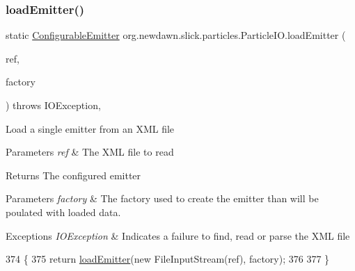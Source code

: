 \subsubsection{\texorpdfstring{load\+Emitter()}{loadEmitter()}\hspace{0.1cm}{\footnotesize\ttfamily [5/6]}}
{\footnotesize\ttfamily static \mbox{\hyperlink{classorg_1_1newdawn_1_1slick_1_1particles_1_1_configurable_emitter}{Configurable\+Emitter}} org.\+newdawn.\+slick.\+particles.\+Particle\+I\+O.\+load\+Emitter (\begin{DoxyParamCaption}\item[{File}]{ref,  }\item[{\mbox{\hyperlink{interfaceorg_1_1newdawn_1_1slick_1_1particles_1_1_configurable_emitter_factory}{Configurable\+Emitter\+Factory}}}]{factory }\end{DoxyParamCaption}) throws I\+O\+Exception\hspace{0.3cm}{\ttfamily [inline]}, {\ttfamily [static]}}

Load a single emitter from an X\+ML file


\begin{DoxyParams}{Parameters}
{\em ref} & The X\+ML file to read \\
\hline
\end{DoxyParams}
\begin{DoxyReturn}{Returns}
The configured emitter 
\end{DoxyReturn}

\begin{DoxyParams}{Parameters}
{\em factory} & The factory used to create the emitter than will be poulated with loaded data. \\
\hline
\end{DoxyParams}

\begin{DoxyExceptions}{Exceptions}
{\em I\+O\+Exception} & Indicates a failure to find, read or parse the X\+ML file \\
\hline
\end{DoxyExceptions}

\begin{DoxyCode}
374                                                                    \{
375         \textcolor{keywordflow}{return} \mbox{\hyperlink{classorg_1_1newdawn_1_1slick_1_1particles_1_1_particle_i_o_af2afc8b074ac941f5b987b1396747a0f}{loadEmitter}}(\textcolor{keyword}{new} FileInputStream(ref), factory);
376 
377     \}
\end{DoxyCode}
\mbox{\label{classorg_1_1newdawn_1_1slick_1_1particles_1_1_particle_i_o_a65b29e3f44f5cd5b19de29483351e225}} 
